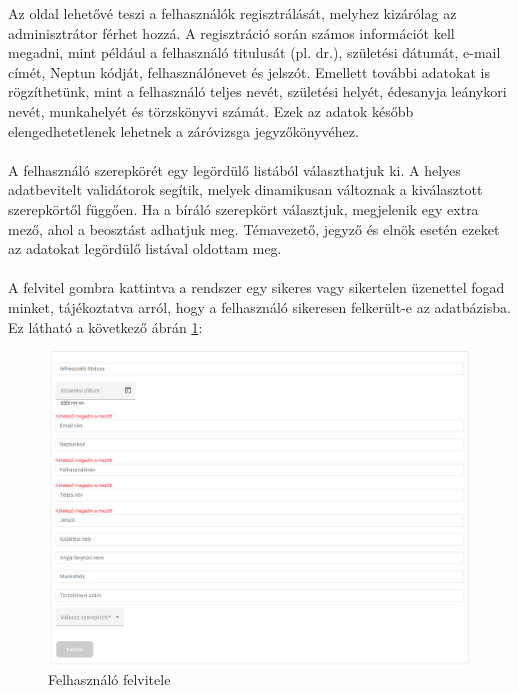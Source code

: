 Az oldal lehetővé teszi a felhasználók regisztrálását, melyhez kizárólag az adminisztrátor férhet hozzá. A regisztráció során számos információt kell megadni, mint például a felhasználó titulusát (pl. dr.), születési dátumát, e-mail címét, Neptun kódját, felhasználónevet és jelszót. Emellett további adatokat is rögzíthetünk, mint a felhasználó teljes nevét, születési helyét, édesanyja leánykori nevét, munkahelyét és törzskönyvi számát. Ezek az adatok később elengedhetetlenek lehetnek a záróvizsga jegyzőkönyvéhez.\\
\\
A felhasználó szerepkörét egy legördülő listából választhatjuk ki. A helyes adatbevitelt validátorok segítik, melyek dinamikusan változnak a kiválasztott szerepkörtől függően. Ha a bíráló szerepkört választjuk, megjelenik egy extra mező, ahol a beosztást adhatjuk meg. Témavezető, jegyző és elnök esetén ezeket az adatokat legördülő listával oldottam meg.\\
\\
A felvitel gombra kattintva a rendszer egy sikeres vagy sikertelen üzenettel fogad minket, tájékoztatva arról, hogy a felhasználó sikeresen felkerült-e az adatbázisba. Ez látható a következő ábrán \ref{fig:addUsers}:

\begin{figure}[h]
\centering
\includegraphics[width=\textwidth]{images/addUsers.png}
\caption{Felhasználó felvitele}
\label{fig:addUsers}
\end{figure}





